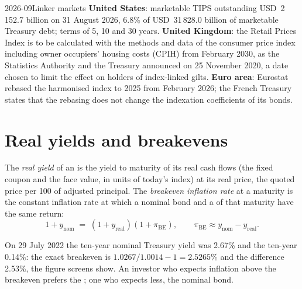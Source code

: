 \begin{dated}{2026-09}{Linker markets}\label{dat:m2:inflation-markets:markets}
\textbf{United States}: marketable TIPS outstanding USD~2\,152.7 billion on 31
August 2026, 6.8\% of USD~31\,828.0 billion of marketable Treasury debt; terms
of 5, 10 and 30 years. \textbf{United Kingdom}: the Retail Prices Index is to
be calculated with the methods and data of the consumer price index including
owner occupiers' housing costs (CPIH) from February 2030, as the Statistics
Authority and the Treasury announced on 25 November 2020, a date chosen to
limit the effect on holders of index-linked gilts. \textbf{Euro area}:
Eurostat rebased the harmonised index to 2025 from February 2026; the French Treasury states that the rebasing does not
change the indexation coefficients of its bonds.
\end{dated}

\section{Real yields and breakevens}

\begin{definition}\label{def:m2:inflation-markets:breakeven}
The \emph{real yield} of an  is the yield to
maturity of its real cash flows (the fixed coupon and the face value, in units
of today's index) at its real price, the quoted price per 100 of adjusted
principal. The \emph{breakeven inflation rate}
at a maturity is the constant inflation rate at which a nominal bond and a 
of that maturity have the same return:
\begin{equation}\label{eq:m2:inflation-markets:fisher}
1 + y_{\mathrm{nom}} \;=\; (1 + y_{\mathrm{real}})(1 + \pi_{\mathrm{BE}}),
\qquad \pi_{\mathrm{BE}} \approx y_{\mathrm{nom}} - y_{\mathrm{real}}.
\end{equation}
\end{definition}

On 29 July 2022 the ten-year nominal Treasury yield was 2.67\% and the ten-year
 0.14\%: the exact breakeven is $1.0267/1.0014 - 1 = 2.5265\%$ and the
difference 2.53\%, the figure screens show. An investor who expects inflation
above the breakeven prefers the ; one who expects less, the nominal bond.

